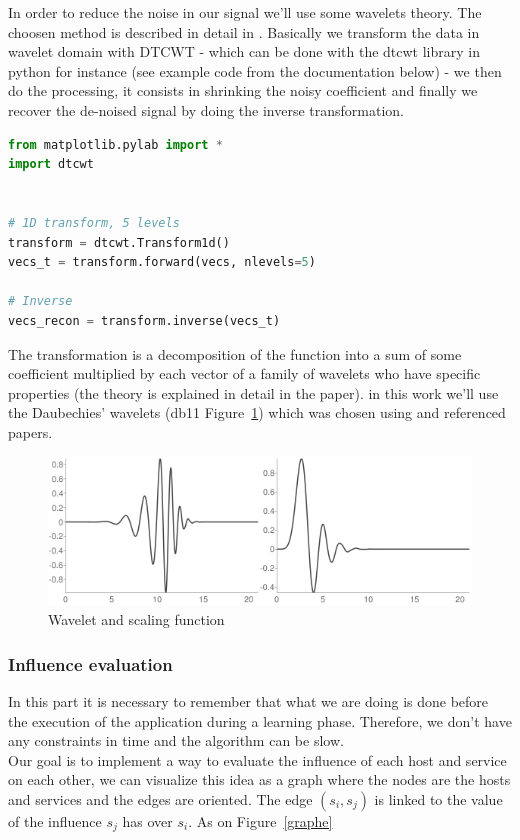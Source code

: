 \documentclass[10pt,a4paper,oneside]{article}
\begin{document}
\vspace{0.8cm}

\begin{multicols}{2}
In order to reduce the noise in our signal we'll use some wavelets theory. The choosen method is described in detail in \cite{dwtselect}. Basically we transform the data in wavelet domain with DTCWT - which can be done with the dtcwt library in python for instance (see example code from the documentation below) - we then do the processing, it consists in shrinking the noisy coefficient and finally we recover the de-noised signal by doing the inverse transformation.
\end{multicols}
\begin{lstlisting}[language=Python, caption=Python dtcwt library example]
from matplotlib.pylab import *
import dtcwt


# 1D transform, 5 levels
transform = dtcwt.Transform1d()
vecs_t = transform.forward(vecs, nlevels=5)

# Inverse
vecs_recon = transform.inverse(vecs_t)
\end{lstlisting}


\begin{multicols}{2}
The transformation is a decomposition of the function into a sum of some coefficient multiplied by each vector of a family of wavelets who have specific properties (the theory is explained in detail in the paper). in this work we'll use the Daubechies' wavelets (db11 Figure~\ref{db}) which was chosen using \cite{dwtselect} and referenced papers.
\end{multicols}

\begin{figure}[!h]
\centering
\includegraphics[scale=0.67]{./images/PNG/db11.png}
\caption{Wavelet and scaling function}
\label{db}
\end{figure}

\begin{multicols}{2}
\subsubsection{Influence evaluation}
In this part it is necessary to remember that what we are doing is done before the execution of the application during a learning phase. Therefore, we don't have any constraints in time and the algorithm can be slow.
\\
Our goal is to implement a way to evaluate the influence of each host and service on each other, we can visualize this idea as a graph where the nodes are the hosts and services and the edges are oriented. The edge $(s_i,s_j)$ is linked to the value of the influence $s_j$ has over $s_i$. As on Figure~\ref{graphe}
\end{multicols}
\end{document}
